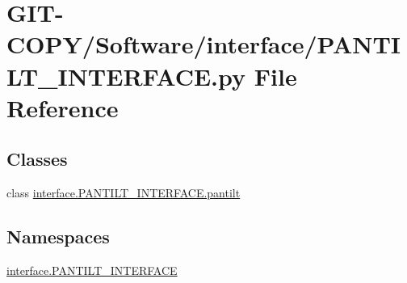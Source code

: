 \hypertarget{GIT-COPY_2Software_2interface_2PANTILT__INTERFACE_8py}{}\section{G\+I\+T-\/\+C\+O\+P\+Y/\+Software/interface/\+P\+A\+N\+T\+I\+L\+T\+\_\+\+I\+N\+T\+E\+R\+F\+A\+C\+E.py File Reference}
\label{GIT-COPY_2Software_2interface_2PANTILT__INTERFACE_8py}
\subsection*{Classes}
\begin{DoxyCompactItemize}
\item 
class \hyperlink{classinterface_1_1PANTILT__INTERFACE_1_1pantilt}{interface.\+P\+A\+N\+T\+I\+L\+T\+\_\+\+I\+N\+T\+E\+R\+F\+A\+C\+E.\+pantilt}
\end{DoxyCompactItemize}
\subsection*{Namespaces}
\begin{DoxyCompactItemize}
\item 
 \hyperlink{namespaceinterface_1_1PANTILT__INTERFACE}{interface.\+P\+A\+N\+T\+I\+L\+T\+\_\+\+I\+N\+T\+E\+R\+F\+A\+C\+E}
\end{DoxyCompactItemize}

